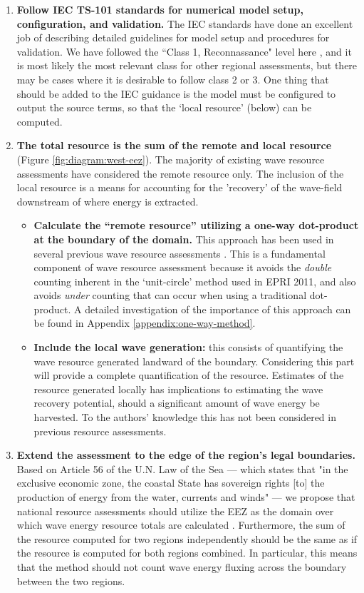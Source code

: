 \begin{enumerate}
\item {\bf Follow IEC TS-101 standards for numerical model setup, configuration, and validation.} The IEC standards have done an excellent job of describing detailed guidelines for model setup and procedures for validation. We have followed the ``Class 1, Reconnassance" level here , and it is most likely the most relevant class for other regional assessments, but there may be cases where it is desirable to follow class 2 or 3. One thing that should be added to the IEC guidance is the model must be configured to output the source terms, so that the `local resource' (below) can be computed.
\item {\bf The total resource is the sum of the remote and local resource} (Figure \ref{fig:diagram:west-eez}). The majority of existing wave resource assessments have considered the remote resource only. The inclusion of the local resource is a means for accounting for the 'recovery' of the wave-field downstream of where energy is extracted.
\begin{itemize}
    \item {\bf Calculate the ``remote resource'' utilizing a one-way dot-product at the boundary of the domain.} This approach has been used in several previous wave resource assessments \citep{gunnQuantifyingGlobalWave2012,hemerRevisedAssessmentAustralia2017}. This is a fundamental component of wave resource assessment because it avoids the {\em double} counting inherent in the `unit-circle' method used in EPRI 2011, and also avoids {\em under} counting that can occur when using a traditional dot-product. A detailed investigation of the importance of this approach can be found in Appendix \ref{appendix:one-way-method}.
    \item {\bf Include the local wave generation:} this consists of quantifying the wave resource generated landward of the boundary. Considering this part will provide a complete quantification of the resource. Estimates of the resource generated locally has implications to estimating the wave recovery potential, should a significant amount of wave energy be harvested. To the authors' knowledge this has not been considered in previous resource assessments.
\end{itemize}
\item {\bf Extend the assessment to the edge of the region's legal boundaries.} Based on Article 56 of the U.N. Law of the Sea — which states that "in the exclusive economic zone, the coastal State has sovereign rights [to] the production of energy from the water, currents and winds" — we propose that national resource assessments should utilize the EEZ as the domain over which wave energy resource totals are calculated \citep{unitednationsgeneralassemblyConventionLawSea1982}. Furthermore, the sum of the resource computed for two regions independently should be the same as if the resource is computed for both regions combined. In particular, this means that the method should not count wave energy fluxing across the boundary between the two regions.
\end{enumerate}

